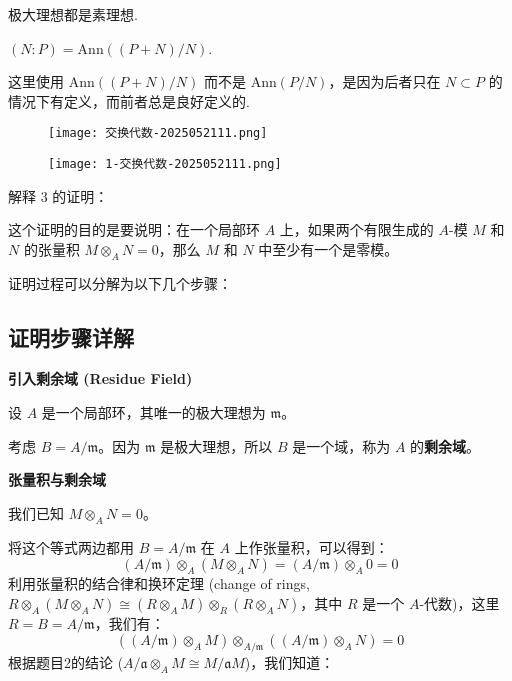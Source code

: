 \begin{proposition}
极大理想都是素理想.
\end{proposition}
\begin{exercise}
$(N:P)=\text{Ann}((P+N)/N)$.
\end{exercise}
\begin{note}
这里使用 $\text{Ann}((P+N)/N)$ 而不是 $\text{Ann}(P/N)$，是因为后者只在 $N\subset P$ 的情况下有定义，而前者总是良好定义的.
\end{note}
\begin{exercise}
\begin{figure}[H]
\centering
\texttt{[image: 交换代数-2025052111.png]}
\label{}
\end{figure}
\begin{figure}[H]
\centering
\texttt{[image: 1-交换代数-2025052111.png]}
\label{}
\end{figure}
\end{exercise}
解释 3 的证明：

这个证明的目的是要说明：在一个局部环 $A$ 上，如果两个有限生成的 $A$-模 $M$ 和 $N$ 的张量积 $M \otimes_A N = 0$，那么 $M$ 和 $N$ 中至少有一个是零模。

证明过程可以分解为以下几个步骤：

\subsection{证明步骤详解}

\textbf{引入剩余域 (Residue Field)}

设 $A$ 是一个局部环，其唯一的极大理想为 $\mathfrak{m}$。

考虑 $B = A/\mathfrak{m}$。因为 $\mathfrak{m}$ 是极大理想，所以 $B$ 是一个域，称为 $A$ 的\textbf{剩余域}。

\textbf{张量积与剩余域}

我们已知 $M \otimes_A N = 0$。

将这个等式两边都用 $B = A/\mathfrak{m}$ 在 $A$ 上作张量积，可以得到：
\[
(A/\mathfrak{m}) \otimes_A (M \otimes_A N) = (A/\mathfrak{m}) \otimes_A 0 = 0
\]
利用张量积的结合律和换环定理 (change of rings, $R \otimes_A (M \otimes_A N) \cong (R \otimes_A M) \otimes_R (R \otimes_A N)$，其中 $R$ 是一个 $A$-代数)，这里 $R=B=A/\mathfrak{m}$，我们有：
\[
( (A/\mathfrak{m}) \otimes_A M ) \otimes_{A/\mathfrak{m}} ( (A/\mathfrak{m}) \otimes_A N ) = 0
\]
根据题目2的结论 ($A/\mathfrak{a} \otimes_A M \cong M/\mathfrak{a}M$)，我们知道：

